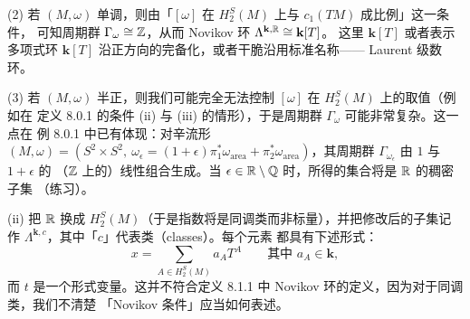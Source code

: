 (2) 若 $(M,\omega)$ 单调，则由「$[\omega]$ 在 $H_2^S(M)$ 上与 $c_1(TM)$ 成比例」这一条件，
可知周期群 $\Gamma_\omega\cong\mathbb{Z}$，从而 Novikov 环 $\Lambda^{\mathbf{k},\mathbb{R}}\cong\mathbf{k}[T]$。
这里 $\mathbf{k}[T]$ 或者表示多项式环 $\mathbf{k}[T]$ 沿正方向的完备化，或者干脆沿用标准名称——
Laurent 级数环。

(3) 若 $(M,\omega)$ 半正，则我们可能完全无法控制 $[\omega]$ 在 $H_2^S(M)$ 上的取值（例如在
定义 8.0.1 的条件 (ii) 与 (iii) 的情形），于是周期群 $\Gamma_\omega$ 可能非常复杂。这一点在
例 8.0.1 中已有体现：对辛流形
$(M,\omega)=(S^2\times S^2,\ \omega_\epsilon=(1+\epsilon)\pi_1^*\omega_{\mathrm{area}}
+\pi_2^*\omega_{\mathrm{area}})$，其周期群 $\Gamma_{\omega_\epsilon}$ 由 $1$ 与 $1+\epsilon$ 的
（$\mathbb{Z}$ 上的）线性组合生成。当 $\epsilon\in\mathbb{R}\setminus\mathbb{Q}$ 时，所得的集合将是 $\mathbb{R}$ 的稠密子集
（练习）。

(ii) 把 $\mathbb{R}$ 换成 $H_2^S(M)$（于是指数将是同调类而非标量），并把修改后的子集记作
$\Lambda^{\mathbf{k},c}$，其中「$c$」代表类（classes）。每个元素
都具有下述形式：
\begin{equation}\tag{8.6}
  x=\sum_{A\in H_2^S(M)}a_A T^A\qquad\text{其中 }a_A\in\mathbf{k},
\end{equation}
而 $t$ 是一个形式变量。这并不符合定义 8.1.1 中 Novikov 环的定义，因为对于同调类，我们不清楚
「Novikov 条件」应当如何表述。

